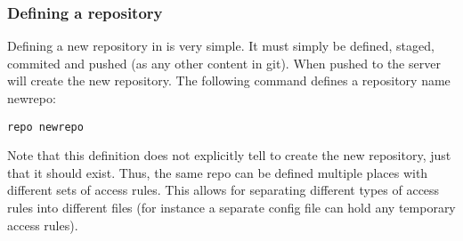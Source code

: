 \subsubsection{Defining a repository}
Defining a new repository in \gitolite{} is very simple.
It must simply be defined, staged, commited and pushed (as any other content in git).
When pushed to the server \gitolite{} will create the new repository.
The following command defines a repository name newrepo:
\begin{center}
\texttt{repo newrepo}
\end{center}
Note that this definition does not explicitly tell \gitolite{} to create the new repository, just that it should exist.
Thus, the same repo can be defined multiple places with different sets of access rules.
This allows for separating different types of access rules into different files (for instance a separate config file can hold any temporary access rules).

